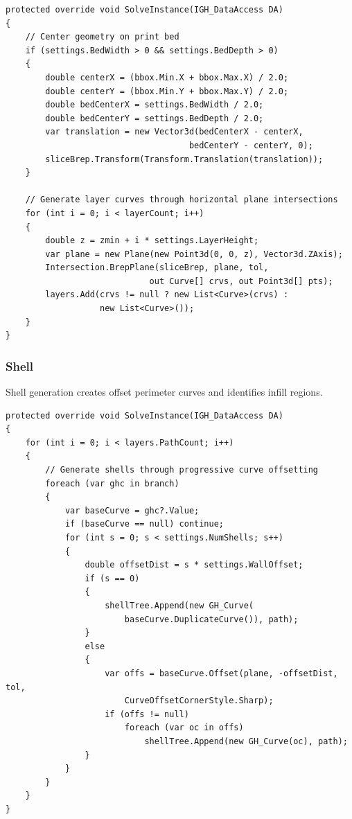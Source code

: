 \begin{verbatim}
protected override void SolveInstance(IGH_DataAccess DA)
{
    // Center geometry on print bed
    if (settings.BedWidth > 0 && settings.BedDepth > 0)
    {
        double centerX = (bbox.Min.X + bbox.Max.X) / 2.0;
        double centerY = (bbox.Min.Y + bbox.Max.Y) / 2.0;
        double bedCenterX = settings.BedWidth / 2.0;
        double bedCenterY = settings.BedDepth / 2.0;
        var translation = new Vector3d(bedCenterX - centerX, 
                                     bedCenterY - centerY, 0);
        sliceBrep.Transform(Transform.Translation(translation));
    }
    
    // Generate layer curves through horizontal plane intersections
    for (int i = 0; i < layerCount; i++)
    {
        double z = zmin + i * settings.LayerHeight;
        var plane = new Plane(new Point3d(0, 0, z), Vector3d.ZAxis);
        Intersection.BrepPlane(sliceBrep, plane, tol, 
                             out Curve[] crvs, out Point3d[] pts);
        layers.Add(crvs != null ? new List<Curve>(crvs) : 
                   new List<Curve>());
    }
}
\end{verbatim}

\subsubsection{Shell}

Shell generation creates offset perimeter curves and identifies infill regions.

\begin{verbatim}
protected override void SolveInstance(IGH_DataAccess DA)
{
    for (int i = 0; i < layers.PathCount; i++)
    {
        // Generate shells through progressive curve offsetting
        foreach (var ghc in branch)
        {
            var baseCurve = ghc?.Value;
            if (baseCurve == null) continue;
            for (int s = 0; s < settings.NumShells; s++)
            {
                double offsetDist = s * settings.WallOffset;
                if (s == 0)
                {
                    shellTree.Append(new GH_Curve(
                        baseCurve.DuplicateCurve()), path);
                }
                else
                {
                    var offs = baseCurve.Offset(plane, -offsetDist, tol, 
                        CurveOffsetCornerStyle.Sharp);
                    if (offs != null)
                        foreach (var oc in offs)
                            shellTree.Append(new GH_Curve(oc), path);
                }
            }
        }
    }
}
\end{verbatim}

